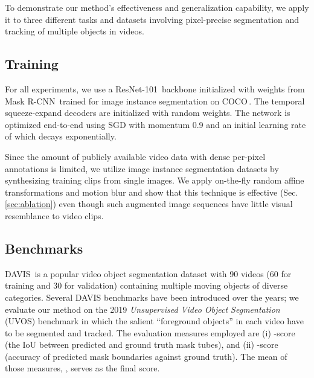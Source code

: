 \documentclass[runningheads]{llncs}
\newcommand{\refsec}[1]{Sec.\,\ref{sec:#1}}
\newcommand{\PAR}[1]{\vskip4pt \noindent {\bf #1~}}
\newcommand{\PARbegin}[1]{\noindent {\bf #1~}}
\begin{document}
To demonstrate our method's effectiveness and generalization capability, we apply it to three different tasks and datasets involving pixel-precise segmentation and tracking of multiple objects in videos. 

\subsection{Training}
\label{sec:training}
For all experiments, we use a ResNet-101\,\cite{He16CVPR} backbone initialized with weights from 
Mask R-CNN\,\cite{He17ICCV} trained for image instance segmentation on COCO\,\cite{Lin14ECCV}. The temporal squeeze-expand decoders are initialized with random weights. The network is optimized end-to-end using SGD with momentum 0.9 and an initial learning rate of  which decays exponentially.

\PAR{Augmented Images.} 
Since the amount of publicly available video data with dense per-pixel annotations is limited, we utilize image instance segmentation datasets by synthesizing training clips from single images. We apply on-the-fly random affine transformations and motion blur and show that this technique is effective (\refsec{ablation}) even though such augmented image sequences have little visual resemblance to video clips.

\subsection{Benchmarks}
\label{sec:benchmarks}

\PARbegin{DAVIS Unsupervised:} DAVIS\,\cite{Caelles19arXiv} is a popular video object segmentation dataset with 90 videos (60 for training and 30 for validation) containing multiple moving objects of diverse categories. Several DAVIS benchmarks have been introduced over the years; we evaluate our method on the 2019 \textit{Unsupervised Video Object Segmentation} (UVOS) benchmark in which the salient ``foreground objects'' in each video have to be segmented and tracked.
The evaluation measures employed are (i) -score (the IoU between predicted and ground truth mask tubes), and (ii) -score (accuracy of predicted mask boundaries against ground truth). The mean of those measures, , serves as the final score.
\end{document}
